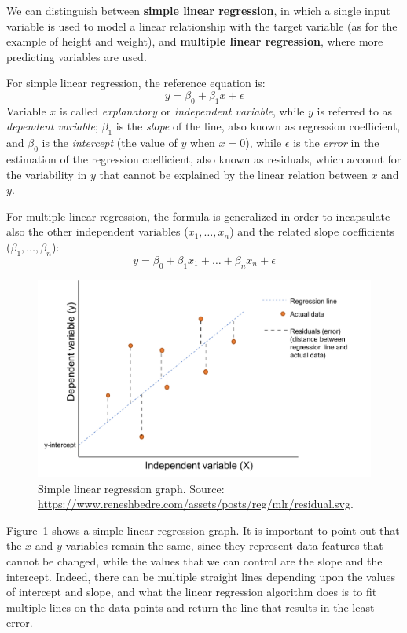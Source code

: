 We can distinguish between \textbf{simple linear regression}, in which a single input variable is used to model a linear relationship with the target variable (as for the example of height and weight), and \textbf{multiple linear regression}, where more predicting variables are used.

For simple linear regression, the reference equation is: \[y = \beta_0 + \beta_1x + \epsilon\]
Variable \(x\) is called \textit{explanatory} or \textit{independent variable}, while \(y\) is referred to as \textit{dependent variable}; \(\beta_1\) is the \textit{slope} of the line, also known as regression coefficient, and \(\beta_0\) is the \textit{intercept} (the value of \(y\) when \(x = 0\)), while \(\epsilon\) is the \textit{error} in the estimation of the regression coefficient, also known as residuals, which account for the variability in \(y\) that cannot be explained by the linear relation between \(x\) and \(y\).

For multiple linear regression, the formula is generalized in order to incapsulate also the other independent variables (\(x_1, \ldots, x_n\)) and the related slope coefficients (\(\beta_1, \ldots, \beta_n\)): \[y = \beta_0 + \beta_1x_1 + \ldots + \beta_nx_n + \epsilon\]

\begin{figure}[h!]
\includegraphics[scale=.7]{figures/simple_linear_regression.pdf}
\centering
\caption{Simple linear regression graph.\newline
Source: \upshape\protect\url{https://www.reneshbedre.com/assets/posts/reg/mlr/residual.svg}.}
\label{fig:simple_linear_regression}
\end{figure}

Figure~\ref{fig:simple_linear_regression} shows a simple linear regression graph. It is important to point out that the \(x\) and \(y\) variables remain the same, since they represent data features that cannot be changed, while the values that we can control are the slope and the intercept. Indeed, there can be multiple straight lines depending upon the values of intercept and slope, and what the linear regression algorithm does is to fit multiple lines on the data points and return the line that results in the least error.

